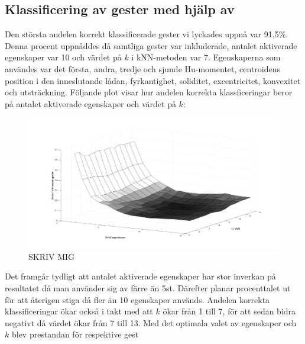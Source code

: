 \documentclass[../rapport_MVEX01-11-05]{subfiles}
\begin{document}
\subsection{Klassificering av gester med hjälp av \knn}
Den största andelen korrekt klassificerade gester vi lyckades uppnå var 91,5\%.
Denna procent uppnåddes då samtliga gester var inkluderade, antalet aktiverade
egenskaper var 10 och värdet på $k$ i kNN-metoden var 7. Egenskaperna som
användes var det första, andra, tredje och sjunde Hu-momentet, centroidens
position i den inneslutande lådan, fyrkantighet, soliditet, excentricitet,
konvexitet och utsträckning. Följande plot visar hur andelen korrekta
klassficeringar beror på antalet aktiverade egenskaper och värdet på $k$:

\begin{figure}[!htpb]
    \begin{center}
        \includegraphics[trim=2cm 2cm 2cm 2cm, width=\columnwidth]{bilder/knn_optimering}
    \end{center}
    \caption{SKRIV MIG}
    \label{fig:knn-optimering}
\end{figure}

Det framgår tydligt att antalet aktiverade egenskaper har stor
inverkan på resultatet då man använder sig av färre än
5st. Därefter planar procenttalet ut för att återigen stiga då
fler än 10 egenskaper används. Andelen korrekta klassificeringar
ökar också i takt med att $k$ ökar från 1 till 7, för att sedan
bidra negativt då värdet ökar från 7 till 13. Med det optimala
valet av egenskaper och $k$ blev prestandan för respektive gest


\end{document}
